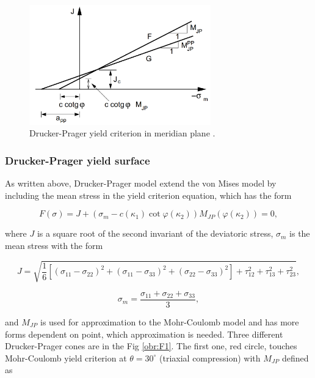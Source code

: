 \begin{figure}[h!]
	\centering	
	\includegraphics[width=0.7\textwidth, angle=0]{obrazky/drucker_prager_meridian.png}
	\caption[Drucker-Prager yield criterion on meridian plane $T$]{Drucker-Prager yield criterion in meridian plane \cite{geofem}.} \label{obr:M1}
\end{figure}

\subsubsection{Drucker-Prager yield surface}\label{sec:drucker-prager_yield_criterion}
\indent

As written above, Drucker-Prager model extend the von Mises model by including the mean stress in the yield criterion equation, which has the form  

\begin{equation}\label{eq:f_yc}
	F(\sigma) = J + (\sigma_m-c(\kappa_{1}) \cot \varphi(\kappa_{2}) )M_{JP}(\varphi(\kappa_{2})) = 0,
\end{equation}

where $J$ is a square root of the second invariant of the deviatoric stress, $\sigma_m$ is the mean stress with the form 
 
\begin{equation}\label{eq:f_J_sigM}
	J = \sqrt{\dfrac{1}{6} \left[(\sigma_{11}-\sigma_{22})^{2} + (\sigma_{11}-\sigma_{33})^{2} + (\sigma_{22}-\sigma_{33})^{2}\right] + \tau_{12}^{2} + \tau_{13}^{2}+ \tau_{23}^{2}},
\end{equation}


\begin{equation}\label{eq:f_sigM}
	\sigma_m = \dfrac{\sigma_{11} + \sigma_{22} + \sigma_{33}}{3},
\end{equation}

and $M_{JP}$ is used for approximation to the Mohr-Coulomb model and has more forms dependent on point, which approximation is needed. Three different Drucker-Prager cones are in the Fig \ref{obr:F1}. The first one, red circle, touches Mohr-Coulomb yield criterion at $\theta = 30^\circ$ (triaxial compression) with $M_{JP}$ defined as

